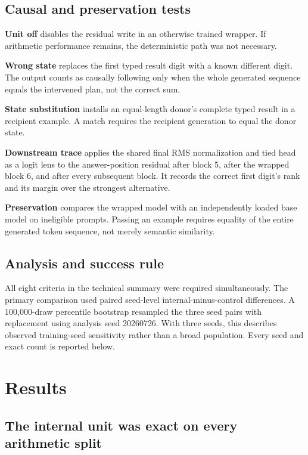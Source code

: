 \documentclass[11pt]{article}
\begin{document}
\subsection{Causal and preservation tests}

\textbf{Unit off} disables the residual write in an otherwise trained wrapper.
If arithmetic performance remains, the deterministic path was not necessary.

\textbf{Wrong state} replaces the first typed result digit with a known
different digit. The output counts as causally following only when the whole
generated sequence equals the intervened plan, not the correct sum.

\textbf{State substitution} installs an equal-length donor's complete typed
result in a recipient example. A match requires the recipient generation to
equal the donor state.

\textbf{Downstream trace} applies the shared final RMS normalization and tied
head as a logit lens to the answer-position residual after block 5, after the
wrapped block 6, and after every subsequent block. It records the correct
first digit's rank and its margin over the strongest alternative.

\textbf{Preservation} compares the wrapped model with an independently loaded
base model on ineligible prompts. Passing an example requires equality of the
entire generated token sequence, not merely semantic similarity.

\subsection{Analysis and success rule}

All eight criteria in the technical summary were required simultaneously.
The primary comparison used paired seed-level internal-minus-control
differences. A 100,000-draw percentile bootstrap resampled the three seed
pairs with replacement using analysis seed 20260726. With three seeds, this
describes observed training-seed sensitivity rather than a broad population.
Every seed and exact count is reported below.

\section{Results}

\subsection{The internal unit was exact on every arithmetic split}
\end{document}
